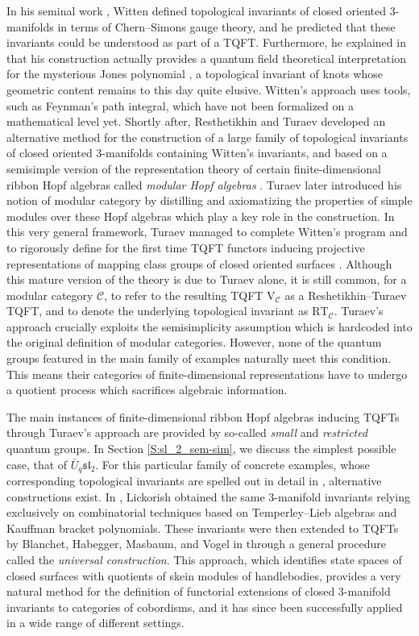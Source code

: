 \documentclass[a4paper,reqno]{amsart}
\theoremstyle{definition}
\theoremstyle{remark}
\newcommand{\rmV}{\mathrm{V}}
\newcommand{\calC}{\mathcal{C}}
\newcommand{\fsl}{\mathfrak{sl}}
\newcommand{\RT}{\mathrm{RT}}
\begin{document}
In his seminal work \cite{W88}, Witten defined topological invariants of closed oriented 3-manifolds in terms of Chern--Simons gauge theory, and he predicted that these invariants could be understood as part of a TQFT. Furthermore, he explained in \cite{W89} that his construction actually provides a quantum field theoretical interpretation for the mysterious Jones polynomial \cite{J85}, a topological invariant of knots whose geometric content remains to this day quite elusive. Witten's approach uses tools, such as Feynman's path integral, which have not been formalized on a mathematical level yet. Shortly after, Resthetikhin and Turaev developed an alternative method for the construction of a large family of topological invariants of closed oriented 3-manifolds containing Witten's invariants, and based on a semisimple version of the representation theory of certain finite-dimensional ribbon Hopf algebras called \textit{modular Hopf algebras} \cite{RT91}. Turaev later introduced his notion of modular category by distilling and axiomatizing the properties of simple modules over these Hopf algebras which play a key role in the construction. In this very general framework, Turaev managed to complete Witten's program and to rigorously define for the first time TQFT functors inducing projective representations of mapping class groups of closed oriented surfaces \cite{T94}. Although this mature version of the theory is due to Turaev alone, it is still common, for a modular category $\calC$, to refer to the resulting TQFT $\rmV_\calC$ as a Reshetikhin--Turaev TQFT, and to denote the underlying topological invariant as $\RT_\calC$. Turaev's approach crucially exploits the semisimplicity assumption which is hardcoded into the original definition of modular categories. However, none of the quantum groups featured in the main family of examples naturally meet this condition. This means their categories of finite-dimensional representations have to undergo a quotient process which sacrifices algebraic information.

The main instances of finite-dimensional ribbon Hopf algebras inducing TQFTs through Turaev's approach are provided by so-called \textit{small} and \textit{restricted} quantum groups. In Section \ref{S:sl_2_sem-sim}, we discuss the simplest possible case, that of $\bar{U}_q \fsl_2$. For this particular family of concrete examples, whose corresponding topological invariants are spelled out in detail in \cite{KM91}, alternative constructions exist. In \cite{L93}, Lickorish obtained the same 3-manifold invariants relying exclusively on combinatorial techniques based on Temperley--Lieb algebras and Kauffman bracket polynomials. These invariants were then extended to TQFTs by Blanchet, Habegger, Masbaum, and Vogel in \cite{BHMV95} through a general procedure called the \textit{universal construction}. This approach, which identifies state spaces of closed surfaces with quotients of skein modules of handlebodies, provides a very natural method for the definition of functorial extensions of closed 3-manifold invariants to categories of cobordisms, and it has since been successfully applied in a wide range of different settings.
\end{document}
